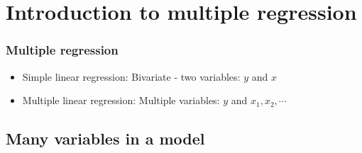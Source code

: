 
\section{Introduction to multiple regression}


\begin{frame}
\frametitle{Multiple regression}

\begin{itemize}

\item Simple linear regression: Bivariate - two variables: $y$ and $x$

\item Multiple linear regression: Multiple variables: $y$ and $x_1, x_2, \cdots$

\end{itemize}

\end{frame}


\subsection{Many variables in a model}


